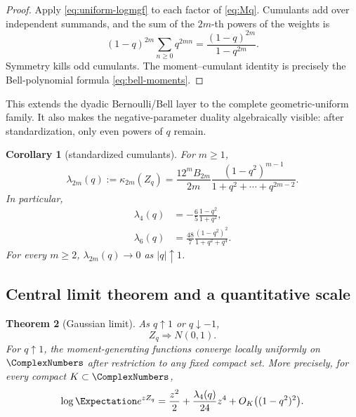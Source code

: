 \documentclass[11pt,oneside]{article}
\newtheorem{theorem}{Theorem}[section]
\newtheorem{corollary}[theorem]{Corollary}
\theoremstyle{definition}
\theoremstyle{remark}
\begin{document}
\begin{proof}
Apply \cref{eq:uniform-logmgf} to each factor of \cref{eq:Mq}.  Cumulants add over independent summands, and the sum of the $2m$-th powers of the weights is
\[
 (1-q)^{2m}\sum_{n\ge0}q^{2mn}
 =\frac{(1-q)^{2m}}{1-q^{2m}}.
\]
Symmetry kills odd cumulants.  The moment--cumulant identity is precisely the Bell-polynomial formula \cref{eq:bell-moments}.
\end{proof}

This extends the dyadic Bernoulli/Bell layer to the complete geometric-uniform family.  It also makes the negative-parameter duality algebraically visible: after standardization, only even powers of $q$ remain.

\begin{corollary}[standardized cumulants]\label{cor:standardized-cumulants}
For $m\ge1$,
\begin{equation}\label{eq:standardized-cumulants}
 \lambda_{2m}(q):=\kappa_{2m}(Z_q)
 =\frac{12^mB_{2m}}{2m}
 \frac{(1-q^2)^{m-1}}{1+q^2+\cdots+q^{2m-2}}.
\end{equation}
In particular,
\begin{align}
 \lambda_4(q)&=-\frac65\frac{1-q^2}{1+q^2},\label{eq:lambda4}\\
 \lambda_6(q)&=\frac{48}{7}\frac{(1-q^2)^2}{1+q^2+q^4}.
 \label{eq:lambda6}
\end{align}
For every $m\ge2$, $\lambda_{2m}(q)\to0$ as $|q|\uparrow1$.
\end{corollary}

\subsection{Central limit theorem and a quantitative scale}

\begin{theorem}[Gaussian limit]\label{thm:clt}
As $q\uparrow1$ or $q\downarrow-1$,
\[
 Z_q\Longrightarrow N(0,1).
\]
For $q\uparrow1$, the moment-generating functions converge locally uniformly on $\ComplexNumbers$ after restriction to any fixed compact set.  More precisely, for every compact $K\subset\ComplexNumbers$,
\begin{equation}\label{eq:analytic-gaussian}
 \log\Expectation e^{zZ_q}
 =\frac{z^2}{2}+\frac{\lambda_4(q)}{24}z^4
 +O_K\bigl((1-q^2)^2\bigr).
\end{equation}
\end{theorem}
\end{document}
